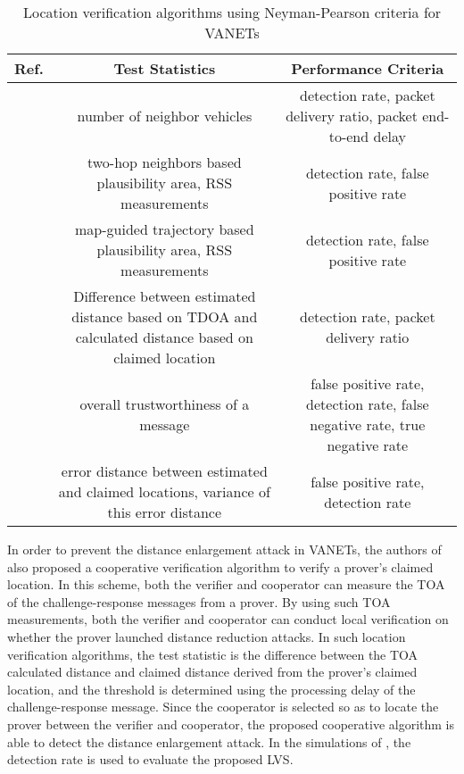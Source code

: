 \documentclass[journal]{IEEEtran}
\begin{document}
\begin{table}
\caption{Location verification algorithms using Neyman-Pearson criteria for VANETs}
\begin{center}
\begin{tabular}{c | c | c }
\hline
Ref. & Test Statistics & Performance Criteria \\
\hline
\cite{ren2009location} & \parbox[c]{3.5cm}{number of neighbor vehicles} & \parbox[c]{3.5cm}{ detection rate, packet delivery ratio, packet end-to-end delay}\\
\hline
\cite{abu2011position} & \parbox[c]{3.5cm}{two-hop neighbors based plausibility area, RSS measurements} & \parbox[c]{3.5cm}{ detection rate, false positive rate}\\
\hline
\cite{abu2012map} & \parbox[c]{3.5cm}{map-guided trajectory based plausibility area, RSS measurements} & \parbox[c]{3.5cm}{ detection rate, false positive rate}\\
\hline
\cite{zhang2012cooperative} & \parbox[c]{3.5cm}{Difference between estimated distance based on TDOA and calculated distance based on claimed location} & \parbox[c]{3.5cm}{detection rate, packet delivery ratio}\\
\hline
\cite{chen2013beacon} & \parbox[c]{3.5cm}{overall trustworthiness of a message} & \parbox[c]{3.5cm}{false positive rate, detection rate, false negative rate, true negative rate}\\
\hline
\cite{yu2013detecting} & \parbox[c]{3.5cm}{error distance between estimated and claimed locations, variance of this error distance} & \parbox[c]{3.5cm}{false positive rate,  detection rate}\\
\hline
\end{tabular}
\end{center}
\label{table_criteria}
\end{table}

In order to prevent the distance enlargement attack in VANETs, the authors of  \cite{zhang2012cooperative} also proposed a cooperative verification algorithm to verify a prover's claimed location. In this scheme, both the verifier and cooperator can measure the TOA of the challenge-response messages from a prover. By using such TOA measurements, both the verifier and cooperator can conduct local verification on whether the prover launched distance reduction attacks. In such location verification algorithms, the test statistic is the difference between the TOA calculated distance and claimed distance derived from the prover's claimed location, and the threshold is determined using the processing delay of the challenge-response message. Since the cooperator is selected so as to locate the prover between the verifier and cooperator, the proposed cooperative algorithm is able to detect the distance enlargement attack.  In the simulations of \cite{zhang2012cooperative}, the detection rate is used to evaluate the proposed LVS.
\end{document}

